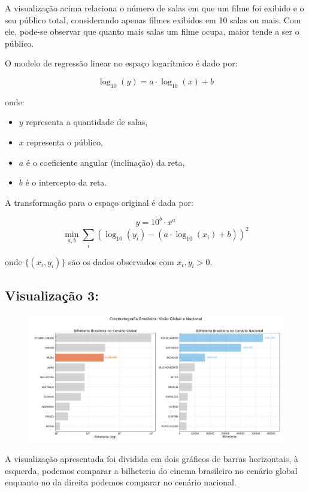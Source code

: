 \documentclass{article}
\begin{document}
A visualização acima relaciona o número de salas em que um filme foi exibido e o seu público total, considerando apenas filmes exibidos em 10 salas ou mais. Com ele, pode-se observar que quanto mais salas um filme ocupa, maior tende a ser o público.



O modelo de regressão linear no espaço logarítmico é dado por:

\[
\log_{10}(y) = a \cdot \log_{10}(x) + b
\]

onde:
\begin{itemize}
    \item \(y\) representa a quantidade de salas,
    \item \(x\) representa o público,
    \item \(a\) é o coeficiente angular (inclinação) da reta,
    \item \(b\) é o intercepto da reta.
\end{itemize}

\bigskip

A transformação para o espaço original é dada por:

\[
y = 10^{b} \cdot x^{a}
\]
\[
\min_{a,b} \sum_{i} \left( \log_{10}(y_i) - \left(a \cdot \log_{10}(x_i) + b \right) \right)^2
\]

onde \(\{(x_i, y_i)\}\) são os dados observados com \(x_i, y_i > 0\).

\subsection*{Visualização 3:}
\begin{figure}[H]
    \centerline{\includegraphics[width = \linewidth]{img/Figure_3.png}}
\end{figure}

A visualização apresentada foi dividida em dois gráficos de barras horizontais, à esquerda, podemos comparar a bilheteria do cinema brasileiro no cenário global\\
enquanto no da direita podemos comparar no cenário nacional.
\end{document}
